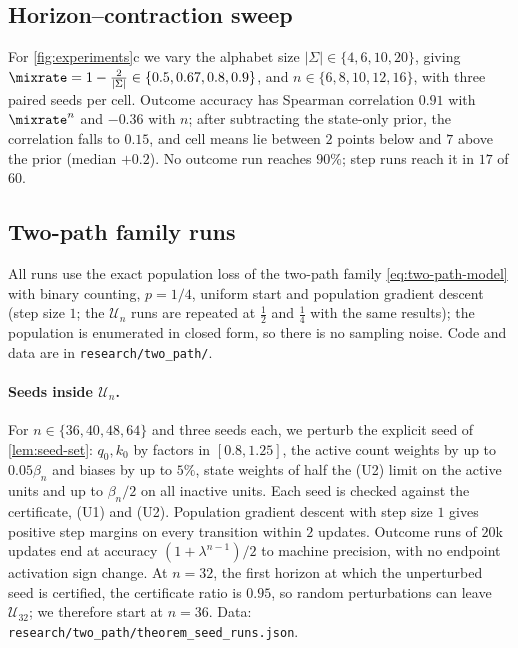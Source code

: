 \subsection{Horizon--contraction sweep}
\label{app:exp-lambda}
For \cref{fig:experiments}c we vary the alphabet size $|\Sigma|\in\{4,6,10,20\}$, giving $\mixrate=1-\frac{2}{|\Sigma|}\in\{0.5,0.67,0.8,0.9\}$,
and $n\in\{6,8,10,12,16\}$, with three paired seeds per cell. Outcome accuracy has Spearman correlation $0.91$ with $\mixrate^n$ and $-0.36$
with $n$; after subtracting the state-only prior, the correlation falls to $0.15$, and cell means lie between $2$ points below and $7$ above
the prior (median $+0.2$). No outcome run reaches $90\%$; step runs reach it in $17$ of $60$.

\subsection{Two-path family runs}
\label{app:two-path-experiments}
All runs use the exact population loss of the two-path family \cref{eq:two-path-model} with binary counting, $p=1/4$,
uniform start and population gradient descent (step size $1$; the $\mathcal U_n$ runs are repeated at $\frac12$ and $\frac14$ with the same results); the population is enumerated in closed form, so there is no sampling
noise. Code and data are in \nolinkurl{research/two_path/}.

\paragraph{Seeds inside $\mathcal U_n$.} For $n\in\{36,40,48,64\}$ and three seeds each, we perturb the explicit seed of
\cref{lem:seed-set}: $q_0,k_0$ by factors in $[0.8,1.25]$, the active count weights by up to $0.05\beta_n$ and biases by
up to $5\%$, state weights of half the (U2) limit on the active units and up to $\beta_n/2$ on all inactive units.
Each seed is checked against the certificate, (U1) and (U2). Population gradient descent with step size $1$ gives
positive step margins on every transition within $2$ updates. Outcome runs of $20$k updates end at accuracy
$(1+\lambda^{n-1})/2$ to machine precision, with no endpoint activation sign change. At $n=32$, the first horizon at
which the unperturbed seed is certified, the certificate ratio is $0.95$, so random perturbations can leave $\mathcal U_{32}$;
we therefore start at $n=36$. Data: \nolinkurl{research/two_path/theorem_seed_runs.json}.

